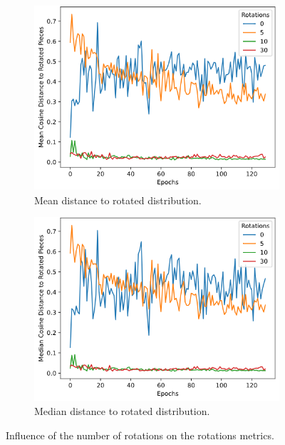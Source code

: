 \begin{figure}[]
    \begin{subfigure}[h]{0.5\linewidth}
        \includegraphics[width=\columnwidth]{images/mean_rotated_study.png}
        \caption{Mean distance to rotated distribution.}
        \label{fig:mean_rotated_study}
    \end{subfigure}
    \hfill
    \begin{subfigure}[h]{0.5\linewidth}
        \includegraphics[width=\columnwidth]{images/median_rotated_study.png}
        \caption{Median distance to rotated distribution.}
        \label{fig:median_rotated_study}
    \end{subfigure}
    \caption{Influence of the number of rotations on the rotations metrics.}
\end{figure}

